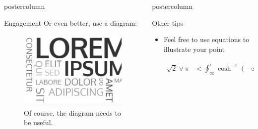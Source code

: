 \documentclass{beamer}
\newlength{\columnheight}
\begin{document}
\begin{frame}
\begin{columns}
\begin{column}{.43\textwidth}
\begin{beamercolorbox}[center]{postercolumn}
\begin{minipage}{.98\textwidth}
{\begin{myblock}{Engagement}
                        Or even better, use a diagram:
                        
                        \begin{figure}
                            \centering
                            \includegraphics[scale=2]{img/lorem_ipsum_image.jpg}
                            \caption{Of course, the diagram needs to be useful.}
                            \label{fig:my_label}
                        \end{figure}
                        
					\end{myblock}\vfill
		}\end{minipage}\end{beamercolorbox}
	\end{column}
	\begin{column}{.57\textwidth}
		\begin{beamercolorbox}[center]{postercolumn}
			\begin{minipage}{.98\textwidth} %
				\parbox[t][\columnheight]{\textwidth}{ 
					\begin{myblock}{Other tips}
    						\begin{itemize}
        						\item Feel free to use equations to illustrate your point
        						
        						\begin{align*} 
            						\sqrt{2} \vee \pi & < \oint_{\infty}^{i} \cosh^{-1} \left(-\infty \right) \,d \Gamma \vee \dots \pm \cosh^{-1} \left( e \Delta \right).
        						\end{align*} 
        						

\end{itemize}
\end{myblock}}
\end{minipage}
\end{beamercolorbox}
\end{column}
\end{columns}
\end{frame}
\end{document}
